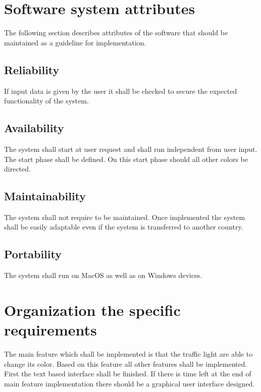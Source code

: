\documentclass[a4paper]{report}
\begin{document}
\section{Software system attributes}
The following section describes attributes of the software that should be maintained as a guideline for implementation. 

\subsection{Reliability}
If input data is given by the user it shall be checked to secure the expected functionality of the system.

\subsection{Availability}
The system shall start at user request and shall run independent from user input. The start phase shall be defined. On this start phase should all other colors be directed.

\subsection{Maintainability}
The system shall not require to be maintained. Once implemented the system shall be easily adaptable even if the system is transferred to another country.

\subsection{Portability}
The system shall run on MacOS as well as on Windows devices. 

\section{Organization the specific requirements}
The main feature which shall be implemented is that the traffic light are able to change its color. Based on this feature all other features shall be implemented. First the text based interface shall be finished. If there is time left at the end of main feature implementation there should be a graphical user interface designed.
\end{document}
